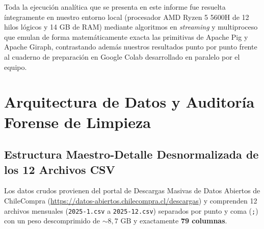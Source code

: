 \documentclass[11pt,a4paper]{article}
\begin{document}
Toda la ejecución analítica que se presenta en este informe fue resuelta íntegramente en nuestro entorno local (procesador AMD Ryzen 5 5600H de 12 hilos lógicos y 14 GB de RAM) mediante algoritmos en \textit{streaming} y multiproceso que emulan de forma matemáticamente exacta las primitivas de Apache Pig y Apache Giraph, contrastando además nuestros resultados punto por punto frente al cuaderno de preparación en Google Colab desarrollado en paralelo por el equipo.

\section{Arquitectura de Datos y Auditoría Forense de Limpieza}

\subsection{Estructura Maestro-Detalle Desnormalizada de los 12 Archivos CSV}

Los datos crudos provienen del portal de Descargas Masivas de Datos Abiertos de ChileCompra (\url{https://datos-abiertos.chilecompra.cl/descargas}) y comprenden 12 archivos mensuales (\texttt{2025-1.csv} a \texttt{2025-12.csv}) separados por punto y coma (\texttt{;}) con un peso descomprimido de $\sim 8,7\text{ GB}$ y exactamente \textbf{79 columnas}.
\end{document}
